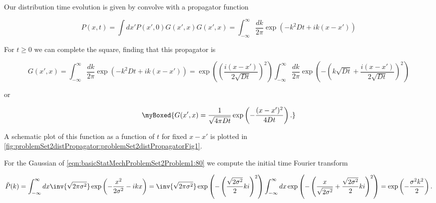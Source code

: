 {Our distribution time evolution is given by convolve with a propagator function

\begin{subequations}
\begin{equation}\label{eqn:basicStatMechProblemSet2Problem1:220}
P(x, t) = \int dx' P(x', 0) G(x', x)
\end{equation}
\begin{equation}\label{eqn:basicStatMechProblemSet2Problem1:240}
G(x', x) 
=
\int_{-\infty}^\infty 
\frac{dk}{2 \pi} 
\exp\left( -k^2 D t + i k (x - x') \right)
\end{equation}
\end{subequations}

For $t \ge 0$ we can complete the square, finding that this propagator is

\begin{dmath}\label{eqn:basicStatMechProblemSet2Problem1:260}
G(x', x) 
=
\int_{-\infty}^\infty 
\frac{dk}{2 \pi} 
\exp\left( -k^2 D t + i k (x - x') \right)
=
\exp\left( \left(\frac{i (x - x')}{2 \sqrt{D t}} \right)^2 \right)
\int_{-\infty}^\infty 
\frac{dk}{2 \pi} 
\exp\left( - \left(k \sqrt{D t} + \frac{i (x - x')}{2 \sqrt{D t}} \right)^2 \right)
\end{dmath}

or

\begin{equation}\label{eqn:basicStatMechProblemSet2Problem1:360}
\myBoxed{
G(x', x) 
=
\frac{1}{\sqrt{4 \pi D t}} \exp\left(
-\frac{(x - x')^2}{4 D t}
\right).
}
\end{equation}

A schematic plot of this function as a function of $t$ for fixed $x - x'$ is plotted in \cref{fig:problemSet2distPropagator:problemSet2distPropagatorFig1}.



For the Gaussian of \ref{eqn:basicStatMechProblemSet2Problem1:80} we compute the initial time Fourier transform

\begin{dmath}\label{eqn:basicStatMechProblemSet2Problem1:280}
\tilde{P}(k) 
= 
\int_{-\infty}^\infty dx 
\inv{\sqrt{2 \pi \sigma^2}} \exp
\left(
-\frac{x^2}{2 \sigma^2}
-i k x 
\right)
=
\inv{\sqrt{2 \pi \sigma^2}} 
\exp
\left(
-\left( \frac{\sqrt{ 2 \sigma^2}}{2} k i
\right)^2
\right)
\int_{-\infty}^\infty dx 
\exp
\left(
-\left( \frac{x}{\sqrt{2 \sigma^2} } + \frac{\sqrt{ 2 \sigma^2}}{2} k i
\right)^2
\right)
=
\exp\left(
-\frac{\sigma^2 k^2}{2}
\right).
\end{dmath}

}
